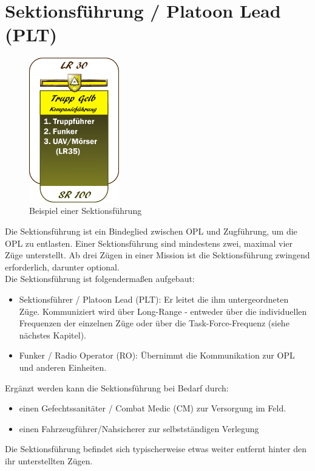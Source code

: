 \section{Sektionsführung / Platoon Lead (PLT)}
\begin{figure}
	\centering 
	\includegraphics[width=0.35\textwidth]{./img/truppenordnung/sektionsfuehrung/sektionsfuehrung.png}
	\caption{Beispiel einer Sektionsführung}
\end{figure}	

Die Sektionsführung ist ein Bindeglied zwischen OPL und Zugführung, um die OPL zu entlasten. Einer Sektionsführung sind mindestens zwei, maximal vier Züge unterstellt. Ab drei Zügen in einer Mission ist die Sektionsführung zwingend erforderlich, darunter optional.\\
Die Sektionsführung ist folgendermaßen aufgebaut:
\begin{itemize}
	\item Sektionsführer / Platoon Lead (PLT): Er leitet die ihm untergeordneten Züge. Kommuniziert wird über Long-Range - entweder über die individuellen Frequenzen der einzelnen Züge oder über die Task-Force-Frequenz (siehe nächstes Kapitel).
	\item Funker / Radio Operator (RO): Übernimmt die Kommunikation zur OPL und anderen Einheiten.
\end{itemize}
Ergänzt werden kann die Sektionsführung bei Bedarf durch:
\begin{itemize}
	\item einen Gefechtssanitäter / Combat Medic (CM) zur Versorgung im Feld.
	\item einen Fahrzeugführer/Nahsicherer zur selbstständigen Verlegung
\end{itemize} 
Die Sektionsführung befindet sich typischerweise etwas weiter entfernt hinter den ihr unterstellten Zügen.
